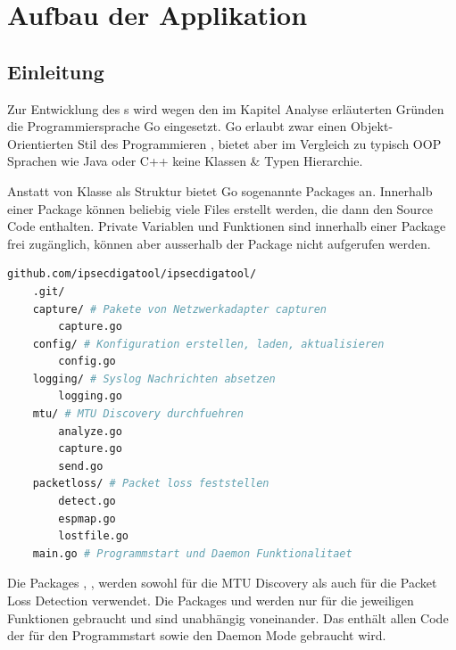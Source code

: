 \section{Aufbau der Applikation}
\label{sec:Aufbau der Applikation}

\subsection{Einleitung}
Zur Entwicklung des \tool{}s wird wegen den im Kapitel Analyse erläuterten Gründen die Programmiersprache Go eingesetzt. Go erlaubt zwar einen Objekt-Orientierten Stil des Programmieren \cite[:240]{golang_faq}, bietet aber im Vergleich zu typisch \acs{OOP} Sprachen wie Java oder C++ keine Klassen \& Typen Hierarchie.

Anstatt von Klasse als Struktur bietet Go sogenannte Packages an. Innerhalb einer Package können beliebig viele  Files erstellt werden, die dann den Source Code enthalten. Private Variablen und Funktionen sind innerhalb einer Package frei zugänglich, können aber ausserhalb der Package nicht aufgerufen werden.

\begin{lstlisting}[language=bash, caption=Package Struktur des \tool{}]                    
github.com/ipsecdigatool/ipsecdigatool/       
	.git/
	capture/ # Pakete von Netzwerkadapter capturen        
		capture.go
	config/ # Konfiguration erstellen, laden, aktualisieren
		config.go
	logging/ # Syslog Nachrichten absetzen
		logging.go
	mtu/ # MTU Discovery durchfuehren
		analyze.go
		capture.go
		send.go
	packetloss/ # Packet loss feststellen
		detect.go
		espmap.go
		lostfile.go
	main.go # Programmstart und Daemon Funktionalitaet
\end{lstlisting}

Die Packages , ,  werden sowohl für die \acs{MTU} Discovery als auch für die Packet Loss Detection verwendet. Die Packages  und  werden nur für die jeweiligen Funktionen gebraucht und sind unabhängig voneinander. Das  enthält allen Code der für den Programmstart sowie den Daemon Mode gebraucht wird.

